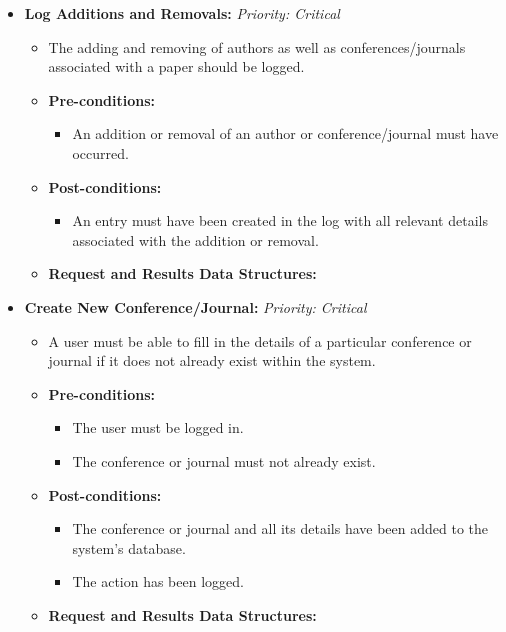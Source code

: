 \documentclass{article}
\begin{document}
\begin{itemize}
					\item \textbf{Log Additions and Removals:} \hfill \textit{Priority: Critical}
					\begin{itemize}
						\item The adding and removing of authors as well as conferences/journals associated with a paper should be logged.
						\item \textbf{Pre-conditions:}
						\begin{itemize}
							\item An addition or removal of an author or conference/journal must have occurred.
						\end{itemize}
						\item \textbf{Post-conditions:}
						\begin{itemize}
							\item An entry must have been created in the log with all relevant details associated with the addition or removal.
						\end{itemize}
						\item \textbf{Request and Results Data Structures:}
					\end{itemize}					
					
					\item \textbf{Create New Conference/Journal:} \hfill \textit{Priority: Critical}
					\begin{itemize}
						\item A user must be able to fill in the details of a particular conference or journal if it does not already exist within the system.
						\item \textbf{Pre-conditions:}
						\begin{itemize}
							\item The user must be logged in.
							\item The conference or journal must not already exist.
						\end{itemize}
						\item \textbf{Post-conditions:}
						\begin{itemize}
							\item The conference or journal and all its details have been added to the system's database.
							\item The action has been logged.
						\end{itemize}
						\item \textbf{Request and Results Data Structures:}
					\end{itemize}
					

\end{itemize}
\end{document}
